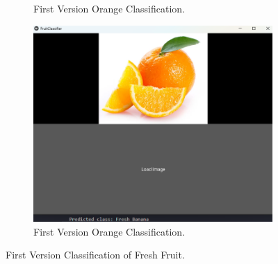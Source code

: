 \documentclass[conference]{IEEEtran}
\begin{document}
\begin{figure}[h]
\begin{subfigure}[b]{0.48\linewidth}
        \caption{First Version Orange Classification.}
        \label{figFB}
    \end{subfigure}
    \hfill
    \begin{subfigure}[b]{0.48\linewidth}
        \centering
        \includegraphics[width=\linewidth]{1layer orage3.png}
        \caption{First Version Orange Classification.}
        \label{figFB}
    \end{subfigure}
    \caption{First Version Classification of Fresh Fruit.}
    \label{Fig1F}
\end{figure}
\end{document}
